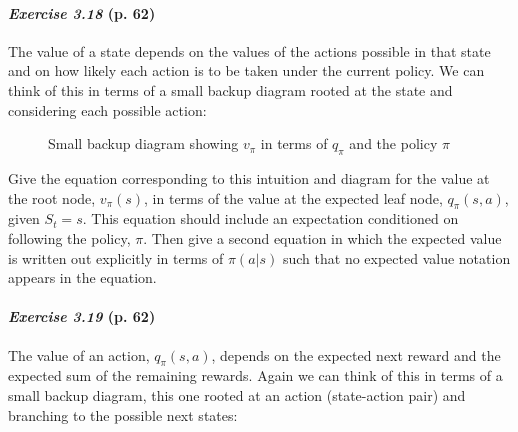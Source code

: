 \documentclass[10pt,a4paper]{article}
\begin{document}
\paragraph{\textit{Exercise 3.18} (p. 62)} The value of a state depends on the values of the actions possible in that state and on how likely each action is to be taken under the current policy. We can
think of this in terms of a small backup diagram rooted at the state and considering each
possible action:

\begin{figure}[h]
\centering
{}
\caption{Small backup diagram showing $v_\pi$ in terms of $q_\pi$ and the policy $\pi$}
\label{relation_state_value_action_value}
\end{figure}


Give the equation corresponding to this intuition and diagram for the value at the root node, $v_\pi(s)$, in terms of the value at the expected leaf node, $q_\pi(s, a)$, given $S_t = s$. This equation should include an expectation conditioned on following the policy, $\pi$. Then give
a second equation in which the expected value is written out explicitly in terms of $\pi(a|s)$ such that no expected value notation appears in the equation.

\clearpage
\paragraph{\textit{Exercise 3.19} (p. 62)} The value of an action, $q_\pi(s, a)$, depends on the expected next reward and
the expected sum of the remaining rewards. Again we can think of this in terms of a
small backup diagram, this one rooted at an action (state-action pair) and branching to
the possible next states:
\end{document}
